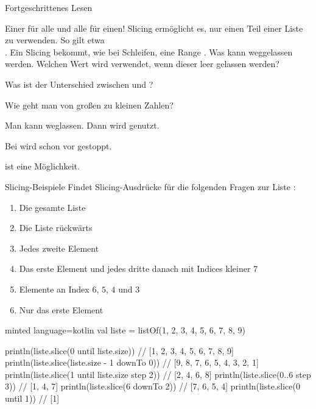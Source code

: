 \begin{task}[points=auto]{Fortgeschrittenes Lesen}
    \begin{subtask*}[points=0]{Einer für alle und alle für einen! }
        Slicing ermöglicht es, nur einen Teil einer Liste zu verwenden.
        So gilt etwa \\.
        Ein Slicing bekommt, wie bei Schleifen, eine Range .
        Was kann weggelassen werden. Welchen Wert wird verwendet,
        wenn dieser leer gelassen werden?

        Was ist der Unterschied zwischen 
        und ?

        Wie geht man von großen zu kleinen Zahlen?

        \begin{solution}
            Man kann  weglassen.
            Dann wird  genutzt.

            Bei  wird schon vor  gestoppt.

             ist eine Möglichkeit.
        \end{solution}
    \end{subtask*}
    \begin{subtask*}[points=0]{Slicing-Beispiele }
        Findet Slicing-Ausdrücke für die folgenden Fragen zur Liste :

        \begin{enumerate}
            \item Die gesamte Liste
            \item Die Liste rückwärts
            \item Jedes zweite Element
            \item Das erste Element und jedes dritte danach mit Indices kleiner $7$
            \item Elemente an Index $6$, $5$, $4$ und $3$
            \item Nur das erste Element
        \end{enumerate}

        \begin{solution}
            \begin{codeBlock}[]{minted language=kotlin}
                val liste = listOf(1, 2, 3, 4, 5, 6, 7, 8, 9)

                println(liste.slice(0 until liste.size))   // [1, 2, 3, 4, 5, 6, 7, 8, 9]
                println(liste.slice(liste.size - 1 downTo 0))  // [9, 8, 7, 6, 5, 4, 3, 2, 1]
                println(liste.slice(1 until liste.size step 2))  // [2, 4, 6, 8]
                println(liste.slice(0..6 step 3))       // [1, 4, 7]
                println(liste.slice(6 downTo 2))        // [7, 6, 5, 4]
                println(liste.slice(0 until 1))         // [1]
            \end{codeBlock}
        \end{solution}
    \end{subtask*}
\end{task}
